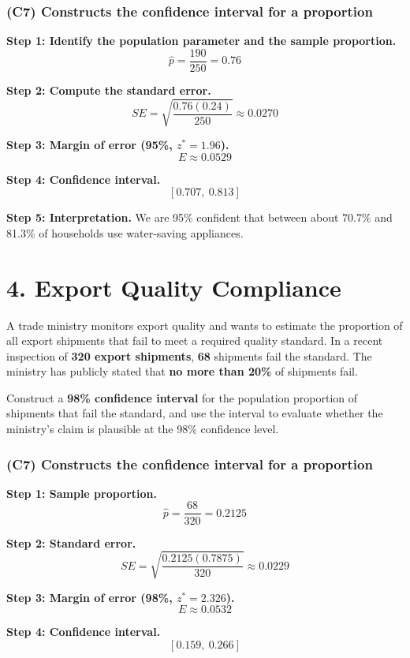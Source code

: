 	\subsubsection*{(C7) Constructs the confidence interval for a proportion}
	
	\textbf{Step 1: Identify the population parameter and the sample proportion.}
	\[
	\hat{p} = \frac{190}{250} = 0.76
	\]
	
	\textbf{Step 2: Compute the standard error.}
	\[
	SE = \sqrt{\frac{0.76(0.24)}{250}} \approx 0.0270
	\]
	
	\textbf{Step 3: Margin of error (95\%, \(z^* = 1.96\)).}
	\[
	E \approx 0.0529
	\]
	
	\textbf{Step 4: Confidence interval.}
	\[
	[0.707,\ 0.813]
	\]
	
	\textbf{Step 5: Interpretation.}
	We are 95\% confident that between about 70.7\% and 81.3\% of households use water-saving appliances.
	
\section*{4. Export Quality Compliance}

A trade ministry monitors export quality and wants to estimate the proportion of all export shipments that fail to meet a required quality standard. In a recent inspection of \textbf{320 export shipments}, \textbf{68} shipments fail the standard. The ministry has publicly stated that \textbf{no more than 20\%} of shipments fail.

Construct a \textbf{98\% confidence interval} for the population proportion of shipments that fail the standard, and use the interval to evaluate whether the ministry’s claim is plausible at the 98\% confidence level.
	
	\subsubsection*{(C7) Constructs the confidence interval for a proportion}
	
	\textbf{Step 1: Sample proportion.}
	\[
	\hat{p} = \frac{68}{320} = 0.2125
	\]
	
	\textbf{Step 2: Standard error.}
	\[
	SE = \sqrt{\frac{0.2125(0.7875)}{320}} \approx 0.0229
	\]
	
	\textbf{Step 3: Margin of error (98\%, \(z^* = 2.326\)).}
	\[
	E \approx 0.0532
	\]
	
	\textbf{Step 4: Confidence interval.}
	\[
	[0.159,\ 0.266]
	\]
	
